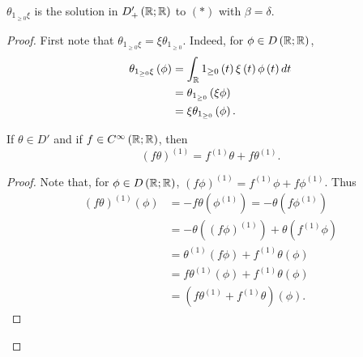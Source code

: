 \begin{remark}
	$\theta _{1 _{\ge  0}\xi}$ is the solution in $D'_{+}\left( \mathbb{R}; \mathbb{R} \right) $ to $\left( * \right) $ with $\beta = \delta$. 
\begin{proof}
	First note that $\theta _{1 _{\ge  0}\xi} = \xi \theta _{1 _{\ge  0}}$. Indeed, for $\phi \in  D\left( \mathbb{R}; \mathbb{R} \right) $, 
	\begin{align*}
		\theta _{1 _{\ge  0}\xi}\left( \phi \right)  &= \int_{\mathbb{R}}^{ } 1 _{\ge 0}\left( t  \right) \xi\left( t \right) \phi\left( t \right)  dt\\
								&= \theta _{1 _{\ge  0}}\left( \xi\phi \right)  \\ 
								&= \xi\theta_{1 _{\ge 0}}\left( \phi \right) 
	.\end{align*}
\begin{fact}
	If $\theta \in  D'$ and if $f \in C^{\infty}\left( \mathbb{R}; \mathbb{R} \right) $, then 
	\[
		\left( f \theta  \right) ^{\left( 1 \right) } = f ^{ \left( 1 \right) } \theta + f \theta ^{ \left( 1 \right) }
	.\] 
\end{fact}
\begin{proof}
	Note that, for $\phi \in  D\left( \mathbb{R}; \mathbb{R} \right) $, $\left( f \phi \right) ^{\left( 1 \right) } = f ^{ \left( 1 \right) } \phi + f \phi ^{ \left( 1 \right) }$. Thus 
	\begin{align*}
		\left( f \theta \right) ^{\left( 1 \right) } \left( \phi \right)  &=  - f \theta \left( \phi ^{\left( 1 \right) } \right)  = -\theta \left( f \phi^{ \left( 1 \right) } \right)  \\
										     &= - \theta \left( \left( f \phi  \right) ^{ \left( 1 \right) } \right)  + \theta\left( f ^{ \left( 1 \right) } \phi \right)  \\
										     &= \theta ^{ \left( 1 \right) } \left( f \phi \right)  + f ^{ \left( 1 \right) }\theta \left( \phi \right)  \\
										     &= f \theta ^{ \left( 1 \right) } \left(  \phi \right)  + f ^{ \left( 1 \right) } \theta \left( \phi \right)  \\
										     &= \left( f \theta ^{\left( 1 \right) } + f ^{ \left( 1 \right) } \theta  \right) \left( \phi \right) 
	.\end{align*}
\end{proof}


\end{proof}
\end{remark}
